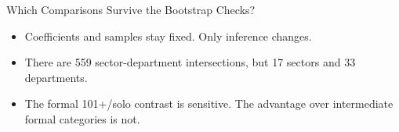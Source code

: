 \begin{frame}{Which Comparisons Survive the Bootstrap Checks?}
  \small\centering
  
  \par\vspace{0.35cm}
  \begin{itemize}
    \item Coefficients and samples stay fixed. Only inference changes.
    \item There are 559 sector-department intersections, but 17 sectors and 33 departments.
    \item The formal 101+/solo contrast is sensitive. The advantage over intermediate formal categories is not.
  \end{itemize}
\end{frame}
